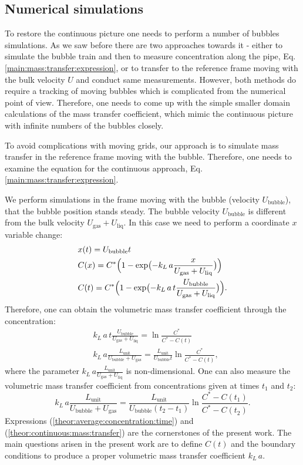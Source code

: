 \documentclass{article}
\newcommand{\beq}{\begin{equation}}
\newcommand{\feq}{\end{equation}}
\newcommand{\beqal}{\begin{equation}\begin{aligned}}
\newcommand{\feqal}{\end{aligned}\end{equation}}
\newcommand{\vol}{k_L\,a}
\newcommand{\lunit}{L_{\mathrm{unit}}}
\newcommand{\ububble}{U_{\mathrm{bubble}}}
\newcommand{\uliq}{U_{\mathrm{liq}}}
\newcommand{\ugas}{U_{\mathrm{gas}}}
\newcommand{\cstar}{C^{*}}
\newcommand{\volnondim}{\vol \frac{\lunit}{\ububble+\ugas}}
\begin{document}
\subsection{Numerical simulations}
To restore the continuous picture one needs to perform a number of bubbles simulations. As we saw
before there are two approaches towards it - either to simulate
the bubble train and then to measure concentration along the pipe, Eq.
\ref{main:mass:transfer:expression}, or to transfer to the reference frame moving with the bulk
velocity $U$ and conduct same measurements. However, both methods do require a tracking of
moving bubbles which is complicated from the numerical point of view. Therefore, one needs to come
up with the simple smaller domain calculations of the mass transfer coefficient, which mimic the
continuous picture with infinite numbers of the bubbles closely. 

To avoid complications with moving grids, our
approach is to simulate mass transfer in the reference frame moving with the bubble. Therefore, one
needs to examine the equation for the continuous approach, Eq.
\ref{main:mass:transfer:expression}. 

We perform simulations in the frame moving with the bubble (velocity
$\ububble$), that the bubble position stands steady. The bubble velocity $\ububble$ is
different from the bulk velocity $\ugas+\uliq$. In this case we need to perform a coordinate $x$
variable change:
\beqal
\label{theor:average:concentration:time}
&x(t)=\ububble t\\
&C(x)=\cstar \Bigl(1-\exp\bigl(-\vol \frac{x}{\ugas+\uliq}\bigr)\Bigr)\\
&C(t)=\cstar \Bigl(1-\exp\bigl(-\vol\, t \frac{\ububble}{\ugas+\uliq}\bigr)\Bigr).
\feqal
Therefore, one can obtain the volumetric mass transfer coefficient through the concentration:
\beqal
&\vol\, t \frac{\ububble}{\ugas+\uliq}=\ln \frac{\cstar}{\cstar-C(t)}\\
&\volnondim=\frac{\lunit}{\ububble t}\ln \frac{\cstar}{\cstar-C(t)},
\feqal
where the parameter $\vol \frac{\lunit}{\ugas+\uliq}$ is non-dimensional. One can also measure the
volumetric mass transfer coefficient from concentrations given at times $t_1$ and $t_2$:
\beq
\label{theor:continuous:mass:transfer}
\volnondim=\frac{\lunit}{\ububble
(t_2-t_1)}\ln\frac{C^{*}-C(t_1)}{C^{*}-C(t_2)}.
\feq
Expressions (\ref{theor:average:concentration:time}) and (\ref{theor:continuous:mass:transfer}) are
the cornerstones of the present work. The main questions arisen in the present work are to define
$C(t)$ and  the boundary conditions to produce a proper volumetric mass transfer coefficient
$\vol$. 
  
\end{document}

